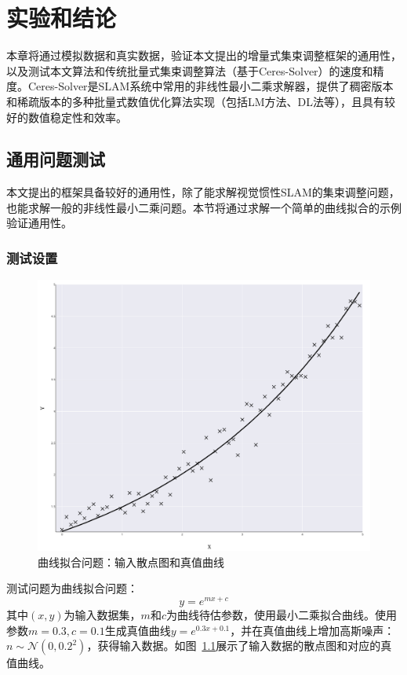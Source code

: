 \chapter{实验和结论}\label{ch:exp}

本章将通过模拟数据和真实数据，验证本文提出的增量式集束调整框架的通用性，以及测试本文算法和传统批量式集束调整算法（基于Ceres-Solver）的速度和精度。Ceres-Solver是SLAM系统中常用的非线性最小二乘求解器，提供了稠密版本和稀疏版本的多种批量式数值优化算法实现（包括LM方法、DL法等），且具有较好的数值稳定性和效率。

\section{通用问题测试}

本文提出的框架具备较好的通用性，除了能求解视觉惯性SLAM的集束调整问题，也能求解一般的非线性最小二乘问题。本节将通过求解一个简单的曲线拟合的示例验证通用性。

\subsection{测试设置}

\begin{figure}[htb!]
    \centering
    \includegraphics[width=.65\textwidth]{Pictures/curse_fitting_gt.png}
    \caption{曲线拟合问题：输入散点图和真值曲线}
    \label{fig:curve_gt}
\end{figure}

测试问题为曲线拟合问题：
\begin{equation}
    y = e^{mx+c}
\end{equation}
其中$(x,y)$为输入数据集，$m$和$c$为曲线待估参数，使用最小二乘拟合曲线。使用参数$m=0.3,c=0.1$生成真值曲线$y=e^{0.3x+0.1}$，并在真值曲线上增加高斯噪声：$n\sim\mathcal{N}(0,0.2^2)$，获得输入数据。如图~\ref{fig:curve_gt}展示了输入数据的散点图和对应的真值曲线。

